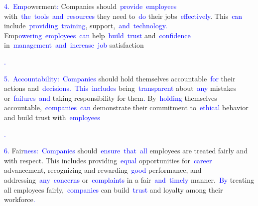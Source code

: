 \documentclass{article}
\begin{document}
\begin{tcolorbox}[colframe=black,colback=white]
{}\textcolor{blue}{4}\textcolor{blue}{.}\textcolor{blue}{~Emp}owerment\textcolor{blue}{:} Companies should\textcolor{blue}{~provide}\textcolor{blue}{~employees} with\textcolor{blue}{~the}\textcolor{blue}{~tools}\textcolor{blue}{~and}\textcolor{blue}{~resources} they need to\textcolor{blue}{~do} their jobs\textcolor{blue}{~effectively}. This\textcolor{blue}{~can} include\textcolor{blue}{~providing}\textcolor{blue}{~training}, support,\textcolor{blue}{~and}\textcolor{blue}{~technology}\textcolor{blue}{.} Emp\textcolor{blue}{owering}\textcolor{blue}{~employees}\textcolor{blue}{~can} help\textcolor{blue}{~build}\textcolor{blue}{~trust} and\textcolor{blue}{~confidence} in\textcolor{blue}{~management}\textcolor{blue}{~and}\textcolor{blue}{~increase}\textcolor{blue}{~job} satisfaction\textcolor{blue}{.

}\textcolor{blue}{5}\textcolor{blue}{.}\textcolor{blue}{~Accountability}\textcolor{blue}{:}\textcolor{blue}{~Companies} should hold themselves accountable\textcolor{blue}{~for} their actions and\textcolor{blue}{~decisions}\textcolor{blue}{.}\textcolor{blue}{~This}\textcolor{blue}{~includes} being\textcolor{blue}{~transparent} about\textcolor{blue}{~any} mistakes or\textcolor{blue}{~failures}\textcolor{blue}{~and} taking responsibility for them\textcolor{blue}{.} By\textcolor{blue}{~holding} themselves accountable,\textcolor{blue}{~companies}\textcolor{blue}{~can} demonstrate their commitment to\textcolor{blue}{~ethical} behavior and build trust with\textcolor{blue}{~employees}\textcolor{blue}{.

}\textcolor{blue}{6}\textcolor{blue}{.} Fair\textcolor{blue}{ness}\textcolor{blue}{:}\textcolor{blue}{~Companies} should\textcolor{blue}{~ensure}\textcolor{blue}{~that}\textcolor{blue}{~all} employees are treated fairly and with respect. This includes providing\textcolor{blue}{~equal} opportunities for\textcolor{blue}{~career} advancement, recognizing and rewarding\textcolor{blue}{~good} performance, and addressing\textcolor{blue}{~any}\textcolor{blue}{~concerns} or\textcolor{blue}{~complaints} in a fair\textcolor{blue}{~and}\textcolor{blue}{~timely} manner.\textcolor{blue}{~By} treating all employees fairly,\textcolor{blue}{~companies} can build\textcolor{blue}{~trust} and loyalty among their workforce\textcolor{blue}{.}\textcolor{blue}{}
\end{tcolorbox}
\end{document}
